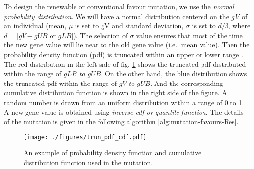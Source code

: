 \documentclass{article}
\begin{document}
To design the renewable or conventional favour mutation, we use the \textit{normal probability  distribution}\cite{wiki:normal-distribution}. 
We will have a normal distribution centered on the \textit{gV} of an individual (mean, $\mu$ is set to gV and standard deviation, $\sigma$ is set to $d/3$, where $d=|gV - gUB$ or $gLB|$). 
The selection of $\sigma$ value ensures that most of the time the new gene value will lie near to the old gene value (i.e., mean value). 
Then the probability density function (pdf) is truncated within an upper or lower range \cite{wiki:truncated-distribution}.
The red distribution in the left side of fig. \ref{fig:truncated pdf and cdf} shows the truncated pdf distributed within the range of \emph{$gLB$ to $gUB$}. 
On the other hand, the blue distribution shows the truncated pdf within the range of \emph{$gV$ to $gUB$}.
And the corresponding cumulative distribution function is shown in the right side of the figure.  
A random number is drawn from an uniform distribution within a range of 0 to 1.
A new gene value is obtained using \textit{inverse cdf or quantile function}\cite{wiki:Quantile-function}.
The details of the mutation is given in the following algorithm \ref{alg:mutation-favours-Res}. 

\begin{figure}
\centering
\texttt{[image: ./figures/trun\_pdf\_cdf.pdf]}
\caption{An example of probability density function and cumulative distribution function used in the mutation.}
\label{fig:truncated pdf and cdf}
\end{figure}
\end{document}
